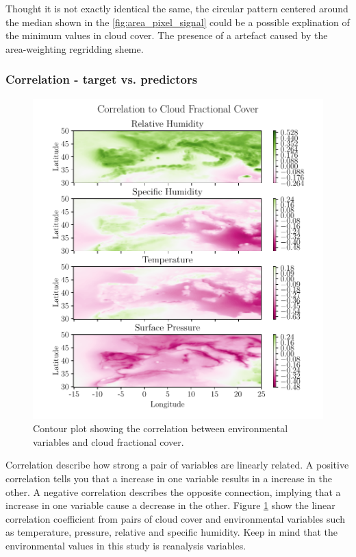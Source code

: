 Thought it is not exactly identical the same, the circular pattern centered around the median shown in the \ref{fig:area_pixel_signal} could be a possible explination of the minimum values in cloud cover. The presence of a artefact caused by the area-weighting regridding sheme.





\subsubsection{Correlation - target vs. predictors}
\begin{figure}[ht]
    \centering
    \includegraphics{python_figs/correlation_figure.pdf}
    \caption{Contour plot showing the correlation between environmental variables and cloud fractional cover. }
    \label{fig:correlation_tcc_vs_envio}
\end{figure}
Correlation describe how strong a pair of variables are linearly related. A positive correlation tells you that a increase in one variable results in a increase in the other. A negative correlation describes the opposite connection, implying that a increase in one variable cause a decrease in the other. Figure \ref{fig:correlation_tcc_vs_envio} show the linear correlation coefficient from pairs of cloud cover and environmental variables such as temperature, pressure, relative and specific humidity.
Keep in mind that the environmental values in this study is reanalysis variables. 

